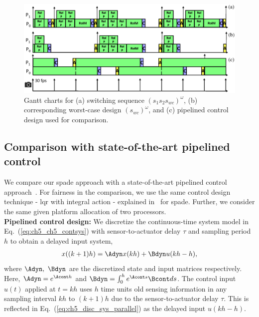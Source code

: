 \begin{figure}
            \centerline{\includegraphics[scale=0.5]{images/results_gantt.eps}}
            \vspace{-1ex}
            \caption{Gantt charts for (a) switching sequence $(s_1 s_2 s_{wc})^\omega$, (b) corresponding worst-case design $(s_{wc})^\omega$, and (c) pipelined control design used for comparison.}
            \label{fig:ch5_result2}
            \vspace{-2ex}
        \end{figure}

\subsection{Comparison with state-of-the-art pipelined control}
We compare our \gls{spade} approach with a state-of-the-art pipelined control approach~\cite{medina2019designing}. For fairness in the comparison, we use the same control design technique - \gls{lqr} with integral action - explained in~\cite{medina2019designing} for \gls{spade}.  
Further, we consider the same given platform allocation of two processors. 
\\[1ex]
\noindent\textbf{Pipelined control design:} 
We discretize the continuous-time system model in Eq.~(\ref{eq:ch5_ch5_contsys}) with sensor-to-actuator delay $\tau$ and sampling period $h$ to obtain a delayed input system,
\begin{eqnarray}
\label{eq:ch5_disc_sys_parallel}
x((k+1)h) = \Adyn x(kh)+\Bdyn u(kh-h),
\end{eqnarray}
where $\Adyn,\ \Bdyn$ are the discretized state and input matrices respectively. 
Here, $\Adyn=e^{\Acont h}$ and  $\Bdyn=\int_{0}^{h} e^{\Acont s} \Bcont ds$.
The control input $u(t)$ applied at $t = kh$
uses $h$ time units old sensing information in
any sampling interval $kh$ to $(k + 1)h$ due to the sensor-to-actuator delay $\tau$. This is reflected in Eq.~(\ref{eq:ch5_disc_sys_parallel}) as the delayed
input $u(kh-h)$.

